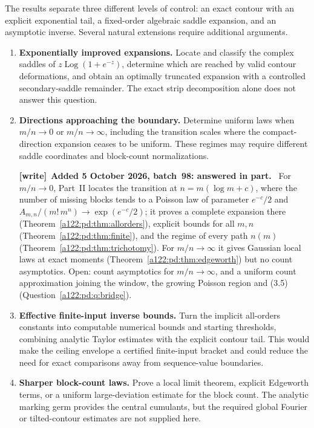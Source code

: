 \documentclass[11pt,letterpaper]{article}
\providecommand{\tightlist}{\setlength{\itemsep}{0pt}\setlength{\parskip}{0pt}}
\newcommand{\Log}{\operatorname{Log}}
\newenvironment{writenote}[1][]{\par\smallskip\begingroup\small
 \noindent\textbf{[write]}\if\relax\detokenize{#1}\relax\else~\textbf{#1.}\fi\ }%
 {\par\endgroup\smallskip}
\numberwithin{equation}{subsection}
\theoremstyle{definition}
\theoremstyle{remark}
\theoremstyle{plain}
\begin{document}
The results separate three different levels of control: an exact contour with an explicit exponential tail, a fixed-order algebraic saddle expansion, and an asymptotic inverse. Several natural extensions require additional arguments.

\begin{enumerate}
\def\labelenumi{\arabic{enumi}.}
\tightlist
\item
  \textbf{Exponentially improved expansions.} Locate and classify the complex saddles of \(z\Log(1+e^{-z})\), determine which are reached by valid contour deformations, and obtain an optimally truncated expansion with a controlled secondary-saddle remainder. The exact strip decomposition alone does not answer this question.
\item
  \textbf{Directions approaching the boundary.} Determine uniform laws when \(m/n\to0\) or \(m/n\to\infty\), including the transition scales where the compact-direction expansion ceases to be uniform. These regimes may require different saddle coordinates and block-count normalizations.

  \begin{writenote}[Added 5 October 2026, batch~98: answered in part]
  For \(m/n\to0\), Part~II locates the transition at \(n=m(\log m+c)\),
  where the number of missing blocks tends to a Poisson law of parameter
  \(e^{-c}/2\) and \(A_{m,n}/(m!\,m^n)\to\exp(e^{-c}/2)\); it proves a
  complete expansion there (Theorem~\ref{a122:pd:thm:allorders}),
  explicit bounds for all \(m,n\) (Theorem~\ref{a122:pd:thm:finite}), and
  the regime of every path \(n(m)\) (Theorem~\ref{a122:pd:thm:trichotomy}).
  For \(m/n\to\infty\) it gives Gaussian local laws at exact moments
  (Theorem~\ref{a122:pd:thm:edgeworth}) but no count asymptotics. Open:
  count asymptotics for \(m/n\to\infty\), and a uniform count
  approximation joining the window, the growing Poisson region and (3.5)
  (Question~\ref{a122:pd:q:bridge}).
  \end{writenote}
\item
  \textbf{Effective finite-input inverse bounds.} Turn the implicit all-orders constants into computable numerical bounds and starting thresholds, combining analytic Taylor estimates with the explicit contour tail. This would make the ceiling envelope a certified finite-input bracket and could reduce the need for exact comparisons away from sequence-value boundaries.
\item
  \textbf{Sharper block-count laws.} Prove a local limit theorem, explicit Edgeworth terms, or a uniform large-deviation estimate for the block count. The analytic marking germ provides the central cumulants, but the required global Fourier or tilted-contour estimates are not supplied here.


\end{enumerate}
\end{document}
